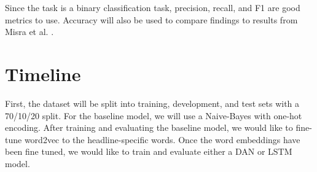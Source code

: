 \documentclass[11pt]{article}
\begin{document}
Since the task is a binary classification task,
precision, recall, and F1 are good metrics to use.
Accuracy will also be used to compare findings
to results from Misra et al. \cite{misra2023Sarcasm}.

\section{Timeline}
First, the dataset will be split into training, development, and test sets
with a 70/10/20 split.
For the baseline model,
we will use a Naive-Bayes with one-hot encoding.
After training and evaluating the baseline model,
we would like to fine-tune word2vec to the headline-specific words.
Once the word embeddings have been fine tuned,
we would like to train and evaluate either a
DAN or LSTM model.

\printbibliography
\end{document}
